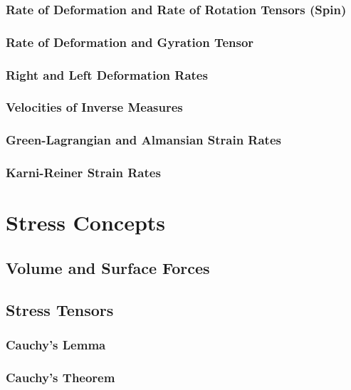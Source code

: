 \documentclass[a5paper,twosided,11pt,DIV=15,BCOR=0mm]{scrbook}
\begin{document}
\subsection{Rate of Deformation and Rate of Rotation Tensors (Spin)}

\subsection{Rate of Deformation and Gyration Tensor}

\subsection{Right and Left Deformation Rates}

\subsection{Velocities of Inverse Measures}

\subsection{Green-Lagrangian and Almansian Strain Rates}

\subsection{Karni-Reiner Strain Rates}


\chapter{Stress Concepts}

\section{Volume and Surface Forces}

\section{Stress Tensors}

\subsection{Cauchy's Lemma}

\subsection{Cauchy's Theorem}
\end{document}
